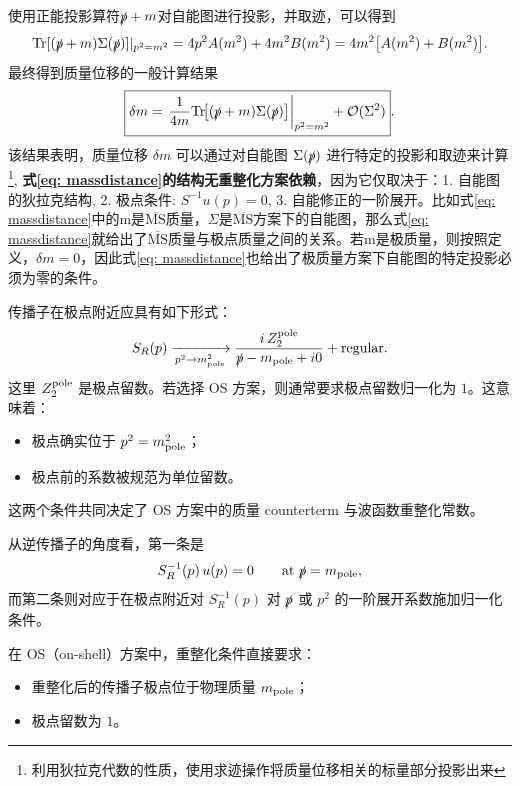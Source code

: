 使用正能投影算符$\slashed{p}+m$对自能图进行投影，并取迹，可以得到
\begin{equation}
\text{Tr}[(\slashed p+m)\Sigma(\slashed p)]|_{p^2=m^2}=4 p^2 A(m^2)+4 m^2 B(m^2)=4 m^2 \bigl[A(m^2)+B(m^2)\bigr].
\end{equation}
最终得到质量位移的一般计算结果
\begin{equation}
\boxed{
\delta m
=
\left.\frac{1}{4m}\text{Tr}\!\big[(\slashed p+m)\Sigma(\slashed p)\big]\right|_{p^2=m^2}
+\mathcal{O}(\Sigma^2)
}.
\label{eq: massdistance}
\end{equation}
该结果表明，质量位移 $\delta m$ 可以通过对自能图 $\Sigma(\slashed p)$ 进行特定的投影和取迹来计算\footnote{利用狄拉克代数的性质，使用求迹操作将质量位移相关的标量部分投影出来}, \textbf{式\eqref{eq: massdistance}的结构无重整化方案依赖}，因为它仅取决于：1. 自能图的狄拉克结构, 2. 极点条件: $S^{-1}u(p)=0$, 3. 自能修正的一阶展开。比如式\eqref{eq: massdistance}中的m是$\overline{\mathrm{MS}}$质量，$\Sigma$是$\overline{\mathrm{MS}}$方案下的自能图，那么式\eqref{eq: massdistance}就给出了$\overline{\mathrm{MS}}$质量与极点质量之间的关系。若m是极质量，则按照定义，$\delta m=0$，因此式\eqref{eq: massdistance}也给出了极质量方案下自能图的特定投影必须为零的条件。

传播子在极点附近应具有如下形式：
\begin{equation}
S_R(p)\xrightarrow[p^2\to m_{\rm pole}^2]{}
\frac{i\,Z_2^{\rm pole}}{\slashed p-m_{\rm pole}+i0}
+\text{regular}.
\end{equation}
这里 \(Z_2^{\rm pole}\) 是极点留数。若选择 OS 方案，则通常要求极点留数归一化为 \(1\)。这意味着：

\begin{itemize}
    \item 极点确实位于 \(p^2=m_{\rm pole}^2\)；
    \item 极点前的系数被规范为单位留数。
\end{itemize}

这两个条件共同决定了 OS 方案中的质量 counterterm 与波函数重整化常数。

从逆传播子的角度看，第一条是
\begin{equation}
S_R^{-1}(p)\,u(p)=0
\qquad \text{at }\slashed p=m_{\rm pole},
\end{equation}
而第二条则对应于在极点附近对 \(S_R^{-1}(p)\) 对 \(\slashed p\) 或 \(p^2\) 的一阶展开系数施加归一化条件。

在 OS（on-shell）方案中，重整化条件直接要求：

\begin{itemize}
    \item 重整化后的传播子极点位于物理质量 \(m_{\rm pole}\)；
    \item 极点留数为 \(1\)。
\end{itemize}

